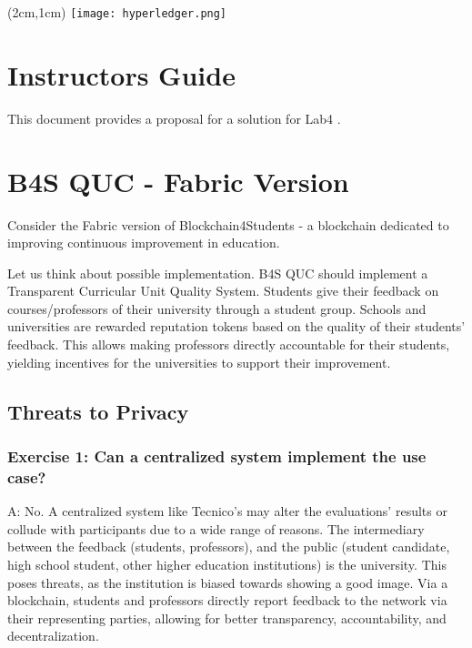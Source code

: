 \documentclass[12pt,a4paper]{article}
\begin{document}
\textblockorigin{-34pt}{-12pt}
\begin{textblock*}{10cm}(2cm,1cm)
\texttt{[image: hyperledger.png]}
\end{textblock*}

\section*{Instructors Guide}
This document provides a proposal for a solution for Lab4 \cite{belchior2019_audits}.




\section{B4S QUC - Fabric Version}

Consider the Fabric version of Blockchain4Students - a blockchain dedicated to improving continuous improvement in education.

Let us think about possible implementation. B4S QUC should implement a Transparent Curricular Unit Quality System. Students give their feedback on courses/professors of their university through a student group. Schools and universities are rewarded reputation tokens based on the quality of their students' feedback. This allows making professors directly accountable for their students, yielding incentives for the universities to support their improvement.



\newtheorem{threat}{Threat}

\subsection{Threats to Privacy}



\subsubsection*{Exercise 1: Can a centralized system implement the use case?}

A: No. A centralized system like Tecnico's may alter the evaluations' results or collude with participants due to a wide range of reasons. The intermediary between the feedback (students, professors), and the public (student candidate, high school student, other higher education institutions) is the university. This poses threats, as the institution is biased towards showing a good image. Via a blockchain, students and professors directly report feedback to the network via their representing parties, allowing for better transparency, accountability, and decentralization.
\end{document}
